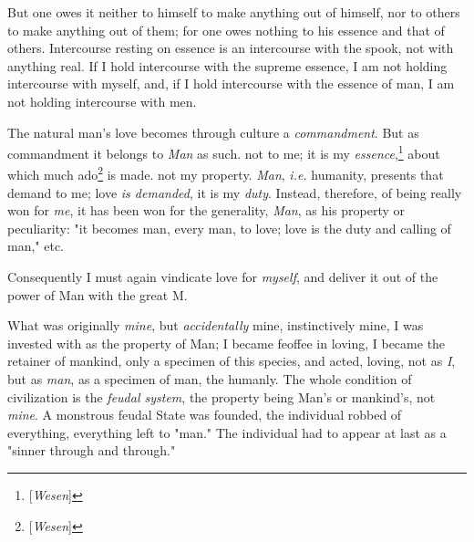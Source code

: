 But one owes it neither to himself to make anything out of himself, nor to 
others to make anything out of them; for one owes nothing to his essence and 
that of others. Intercourse resting on essence is an intercourse with the 
spook, not with anything real. If I hold intercourse with the supreme essence, 
I am not holding intercourse with myself, and, if I hold intercourse with the 
essence of man, I am not holding intercourse with men.

The natural man's love becomes through culture a \textit{commandment}. But as 
commandment it belongs to \textit{Man} as such. not to me; it is my 
\textit{essence},\footnote{[\textit{Wesen}]} about which much 
ado\footnote{[\textit{Wesen}]} is made. not my property. \textit{Man}, 
\textit{i.e.} humanity, presents that demand to me; love \textit{is demanded}, 
it is my \textit{duty}. Instead, therefore, of being really won for 
\textit{me}, it has been won for the generality, \textit{Man}, as his property 
or peculiarity: "{}it becomes man, every man, to love; love is the duty and 
calling of man,"{} etc.

Consequently I must again vindicate love for \textit{myself}, and deliver it 
out of the power of Man with the great M.

What was originally \textit{mine}, but \textit{accidentally} mine, 
instinctively mine, I was invested with as the property of Man; I became 
feoffee in loving, I became the retainer of mankind, only a specimen of this 
species, and acted, loving, not as \textit{I}, but as \textit{man}, as a 
specimen of man, the humanly. The whole condition of civilization is the 
\textit{feudal system}, the property being Man's or mankind's, not 
\textit{mine}. A monstrous feudal State was founded, the individual robbed of 
everything, everything left to "{}man."{} The individual had to appear at last 
as a "{}sinner through and through."{}

